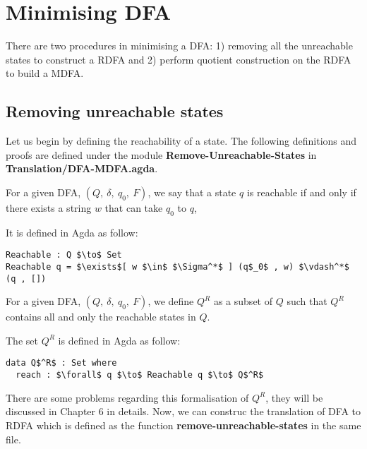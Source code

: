 \section{Minimising DFA}
\par There are two procedures in minimising a DFA: 1) removing all the
unreachable states to construct a RDFA and 2) perform quotient
construction on the RDFA to build a MDFA. 

\subsection{Removing unreachable states}
\par Let us begin by defining the
reachability of a state. The following definitions and proofs are
defined under the module \textbf{Remove-Unreachable-States} in
\textbf{Translation/DFA-MDFA.agda}. 

\begin{defn}
\noindent For a given DFA, \((Q,\ \delta,\ q_0,\ F)\), we say that a state \(q\) is reachable if and
only if there exists a string \(w\) that can take \(q_0\) to \(q\), 
\end{defn} 

\par It is defined in Agda as follow:
\begin{lstlisting}[mathescape=true,xleftmargin=.25\textwidth]
Reachable : Q $\to$ Set
Reachable q = $\exists$[ w $\in$ $\Sigma^*$ ] (q$_0$ , w) $\vdash^*$ (q , [])
\end{lstlisting}

\begin{defn}
\noindent For a given DFA, \((Q,\ \delta,\ q_0,\ F)\), we define \(Q^R\) as a
subset of \(Q\) such that \(Q^R\) contains all and only the reachable states in \(Q\). 
\end{defn}

\par The set \(Q^R\) is defined in Agda as follow:
\begin{lstlisting}[mathescape=true,xleftmargin=.25\textwidth]
data Q$^R$ : Set where
  reach : $\forall$ q $\to$ Reachable q $\to$ Q$^R$
\end{lstlisting}

\par There are some problems regarding this formalisation of \(Q^R\),
they will be discussed in Chapter 6 in details. Now, we can construc the
translation of DFA to RDFA which is defined 
as the function \textbf{remove-unreachable-states} in the same file. 

